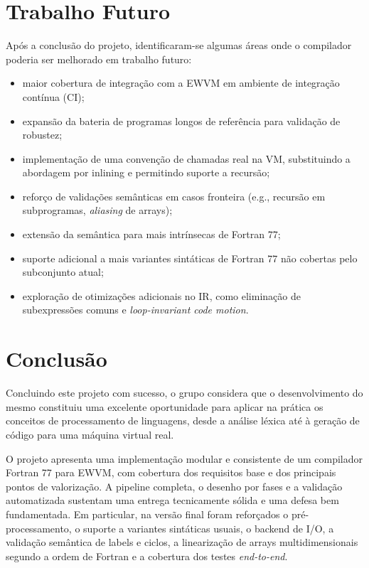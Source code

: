 \documentclass{article}
\begin{document}
\section{Trabalho Futuro}

Após a conclusão do projeto, identificaram-se algumas áreas onde o compilador poderia ser
melhorado em trabalho futuro:

\begin{itemize}
  \item maior cobertura de integração com a EWVM em ambiente de integração contínua (CI);
  \item expansão da bateria de programas longos de referência para validação de robustez;
  \item implementação de uma convenção de chamadas real na VM, substituindo a abordagem por
        inlining e permitindo suporte a recursão;
  \item reforço de validações semânticas em casos fronteira (e.g., recursão em
        subprogramas, \textit{aliasing} de arrays);
  \item extensão da semântica para mais intrínsecas de Fortran 77;
  \item suporte adicional a mais variantes sintáticas de Fortran 77 não cobertas pelo
        subconjunto atual;
  \item exploração de otimizações adicionais no IR, como eliminação de subexpressões
        comuns e \textit{loop-invariant code motion}.
\end{itemize}

\section{Conclusão}

Concluindo este projeto com sucesso, o grupo considera que o desenvolvimento do mesmo
constituiu uma excelente oportunidade para aplicar na prática os conceitos de processamento
de linguagens, desde a análise léxica até à geração de código para uma máquina virtual real.

O projeto apresenta uma implementação modular e consistente de um compilador Fortran 77
para EWVM, com cobertura dos requisitos base e dos principais pontos de valorização. A
pipeline completa, o desenho por fases e a validação automatizada sustentam uma entrega
tecnicamente sólida e uma defesa bem fundamentada. Em particular, na versão final foram
reforçados o pré-processamento, o suporte a variantes sintáticas usuais, o backend de I/O,
a validação semântica de labels e ciclos, a linearização de arrays multidimensionais segundo
a ordem de Fortran e a cobertura dos testes \textit{end-to-end}.
\end{document}
